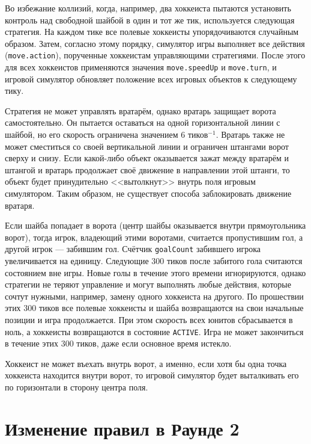 Во избежание коллизий, когда, например, два хоккеиста пытаются установить контроль над свободной шайбой в один и тот же тик, используется
следующая стратегия. На каждом тике все полевые хоккеисты упорядочиваются случайным образом. Затем, согласно этому порядку, симулятор игры
выполняет все действия (\texttt{move.action}), порученные хоккеистам управляющими стратегиями. После этого для всех хоккеистов применяются
значения \texttt{move.speedUp} и \texttt{move.turn}, и игровой симулятор обновляет положение всех игровых объектов к следующему тику.

Стратегия не может управлять вратарём, однако вратарь защищает ворота самостоятельно. Он пытается оставаться на одной горизонтальной линии
с шайбой, но его скорость ограничена значением $6$ тиков$^{-1}$. Вратарь также не может сместиться со своей вертикальной линии и ограничен
штангами ворот сверху и снизу. Если какой-либо объект оказывается зажат между вратарём и штангой и вратарь продолжает своё движение в
направлении этой штанги, то объект будет принудительно <<вытолкнут>> внутрь поля игровым симулятором. Таким образом, не существует способа
заблокировать движение вратаря.

Если шайба попадает в ворота (центр шайбы оказывается внутри прямоугольника ворот), тогда игрок, владеющий этими воротами, считается
пропустившим гол, а другой игрок --- забившим гол. Счётчик \texttt{goalCount} забившего игрока увеличивается на единицу. Следующие $300$
тиков после забитого гола считаются состоянием вне игры. Новые голы в течение этого времени игнорируются, однако стратегии не теряют
управление и могут выполнять любые действия, которые сочтут нужными, например, замену одного хоккеиста на другого. По прошествии этих $300$
тиков все полевые хоккеисты и шайба возвращаются на свои начальные позиции и игра продолжается. При этом скорость всех юнитов сбрасывается
в ноль, а хоккеисты возвращаются в состояние \texttt{ACTIVE}. Игра не может закончиться в течение этих $300$ тиков, даже если основное время
истекло.

Хоккеист не может въехать внутрь ворот, а именно, если хотя бы одна точка хоккеиста находится внутри ворот, то игровой симулятор будет
выталкивать его по горизонтали в сторону центра поля.

\section{Изменение правил в Раунде 2}

